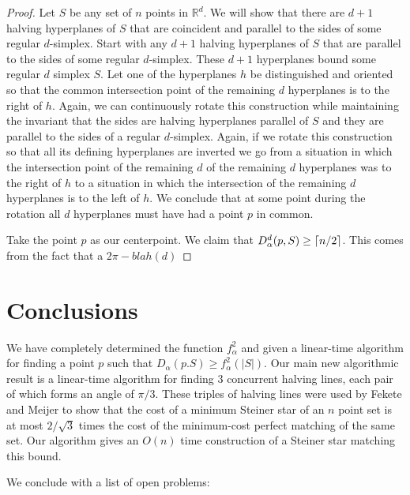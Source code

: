 \documentclass[lotsofwhite]{patmorin}
\begin{document}
\begin{proof}
Let $S$ be any set of $n$ points in $\mathbb{R}^d$.  We will show that
there are $d+1$ halving hyperplanes of $S$ that are coincident and
parallel to the sides of some regular $d$-simplex.  Start with any
$d+1$ halving hyperplanes of $S$ that are parallel to the sides of
some regular $d$-simplex.  These $d+1$ hyperplanes bound some regular
$d$ simplex $S$. Let one of the hyperplanes $h$ be distinguished and
oriented so that the common intersection point of the remaining $d$
hyperplanes is to the right of $h$.  Again, we can continuously rotate
this construction while maintaining the invariant that the sides are
halving hyperplanes parallel of $S$ and they are parallel to the sides
of a regular $d$-simplex.  Again, if we rotate this construction so
that all its defining hyperplanes are inverted we go from a situation
in which the intersection point of the remaining $d$ of the remaining
$d$ hyperplanes was to the right of $h$ to a situation in which the
intersection of the remaining $d$ hyperplanes is to the left of $h$.
We conclude that at some point during the rotation all $d$
hyperplanes must have had a point $p$ in common.

Take the point $p$ as our centerpoint.  We claim that
$D_\alpha^d(p,S)\ge \left\lceil n/2 \right\rceil$.  This comes from the fact that a
$2\pi-blah(d)$
\end{proof}


\section{Conclusions}

We have completely determined the function $f^2_\alpha$ and given a
linear-time algorithm for finding a point $p$ such that
$D_\alpha(p.S)\ge f^2_\alpha(|S|)$.  Our main new algorithmic result
is a linear-time algorithm for finding 3 concurrent halving lines,
each pair of which forms an angle of $\pi/3$.  These triples of
halving lines were used by Fekete and Meijer to show that the cost of
a minimum Steiner star of an $n$ point set is at most $2/\sqrt{3}$
times the cost of the minimum-cost perfect matching of the same set.
Our algorithm gives an $O(n)$ time construction of a Steiner star
matching this bound.



We conclude with a list of open problems:
\end{document}
